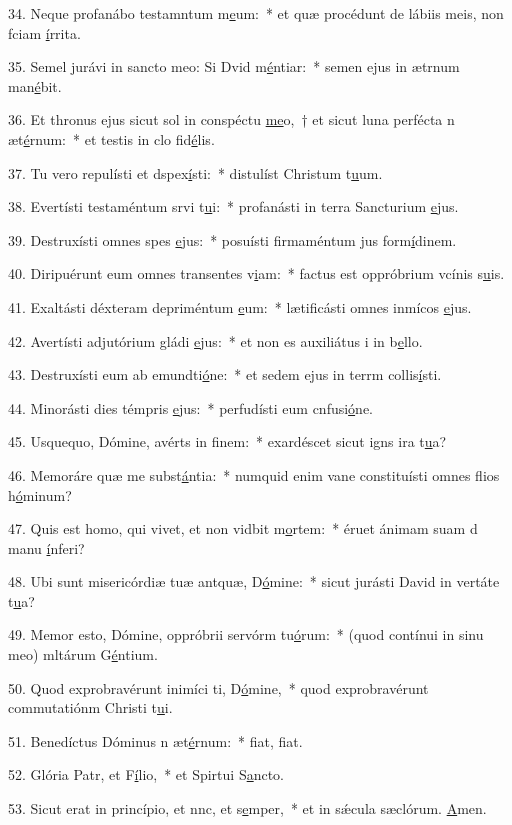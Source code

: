 34. Neque profanábo testamntum m\uline{e}um:~* et quæ procédunt de lábiis meis, non fciam \uline{í}rrita.\par 
35. Semel jurávi in sancto meo: Si Dvid m\uline{é}ntiar:~* semen ejus in ætrnum man\uline{é}bit.\par 
36. Et thronus ejus sicut sol in conspéctu \uline{me}o,~† et sicut luna perfécta n æt\uline{é}rnum:~* et testis in clo fid\uline{é}lis.\par 
37. Tu vero repulísti et dspex\uline{í}sti:~* distulíst Christum t\uline{u}um.\par 
38. Evertísti testaméntum srvi t\uline{u}i:~* profanásti in terra Sancturium \uline{e}jus.\par 
39. Destruxísti omnes spes \uline{e}jus:~* posuísti firmaméntum jus form\uline{í}dinem.\par 
40. Diripuérunt eum omnes transentes v\uline{i}am:~* factus est oppróbrium vcínis s\uline{u}is.\par 
41. Exaltásti déxteram depriméntum \uline{e}um:~* lætificásti omnes inmícos \uline{e}jus.\par 
42. Avertísti adjutórium gládi \uline{e}jus:~* et non es auxiliátus i in b\uline{e}llo.\par 
43. Destruxísti eum ab emundti\uline{ó}ne:~* et sedem ejus in terrm collis\uline{í}sti.\par 
44. Minorásti dies témpris \uline{e}jus:~* perfudísti eum cnfusi\uline{ó}ne.\par 
45. Usquequo, Dómine, avérts in f\uline{i}nem:~* exardéscet sicut igns ira t\uline{u}a?\par 
46. Memoráre quæ me subst\uline{á}ntia:~* numquid enim vane constituísti omnes flios h\uline{ó}minum?\par 
47. Quis est homo, qui vivet, et non vidbit m\uline{o}rtem:~* éruet ánimam suam d manu \uline{í}nferi?\par 
48. Ubi sunt misericórdiæ tuæ antquæ, D\uline{ó}mine:~* sicut jurásti David in vertáte t\uline{u}a?\par 
49. Memor esto, Dómine, oppróbrii servórm tu\uline{ó}rum:~* (quod contínui in sinu meo) mltárum G\uline{é}ntium.\par 
50. Quod exprobravérunt inimíci ti, D\uline{ó}mine,~* quod exprobravérunt commutatiónm Christi t\uline{u}i.\par 
51. Benedíctus Dóminus n æt\uline{é}rnum:~* fiat, f\uline{i}at.\par 
52. Glória Patr, et F\uline{í}lio,~* et Spirtui S\uline{a}ncto.\par 
53. Sicut erat in princípio, et nnc, et s\uline{e}mper,~* et in sǽcula sæclórum. \uline{A}men.\par 
